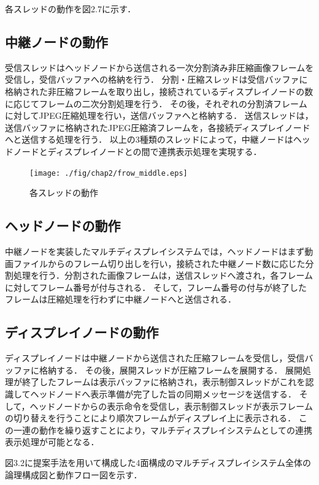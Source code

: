 各スレッドの動作を図2.7に示す．

\subsection*{中継ノードの動作}
受信スレッドはヘッドノードから送信される一次分割済み非圧縮画像フレームを受信し，受信バッファへの格納を行う．
分割・圧縮スレッドは受信バッファに格納された非圧縮フレームを取り出し，接続されているディスプレイノードの数に応じてフレームの二次分割処理を行う．
その後，それぞれの分割済フレームに対してJPEG圧縮処理を行い，送信バッファへと格納する．
送信スレッドは，送信バッファに格納されたJPEG圧縮済フレームを，各接続ディスプレイノードへと送信する処理を行う．
以上の3種類のスレッドによって，中継ノードはヘッドノードとディスプレイノードとの間で連携表示処理を実現する．

\begin{figure}[H]
  \hspace*{\fill}
  \texttt{[image: ./fig/chap2/frow\_middle.eps]}
  \hspace*{\fill}
  \caption{各スレッドの動作}
\end{figure}

\subsection*{ヘッドノードの動作}
中継ノードを実装したマルチディスプレイシステムでは，ヘッドノードはまず動画ファイルからのフレーム切り出しを行い，接続された中継ノード数に応じた分割処理を行う．分割された画像フレームは，送信スレッドへ渡され，各フレームに対してフレーム番号が付与される．
そして，フレーム番号の付与が終了したフレームは圧縮処理を行わずに中継ノードへと送信される．

\subsection*{ディスプレイノードの動作}
ディスプレイノードは中継ノードから送信された圧縮フレームを受信し，受信バッファに格納する．
その後，展開スレッドが圧縮フレームを展開する．
展開処理が終了したフレームは表示バッファに格納され，表示制御スレッドがこれを認識してヘッドノードへ表示準備が完了した旨の同期メッセージを送信する．
そして，ヘッドノードからの表示命令を受信し，表示制御スレッドが表示フレームの切り替えを行うことにより順次フレームがディスプレイ上に表示される．
この一連の動作を繰り返すことにより，マルチディスプレイシステムとしての連携表示処理が可能となる．

図3.2に提案手法を用いて構成した4面構成のマルチディスプレイシステム全体の論理構成図と動作フロー図を示す．


